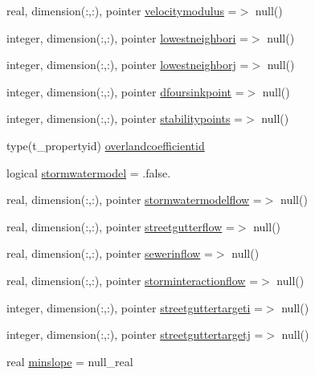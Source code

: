 \begin{DoxyCompactItemize}
real, dimension(\+:,\+:), pointer \mbox{\hyperlink{structmodulerunoff_1_1t__runoff_a9a3dbef4833492c548078e7cbb47c4f1}{velocitymodulus}} =$>$ null()
\item 
integer, dimension(\+:,\+:), pointer \mbox{\hyperlink{structmodulerunoff_1_1t__runoff_a44d937c36d4dad96ed42aedc2c59bede}{lowestneighbori}} =$>$ null()
\item 
integer, dimension(\+:,\+:), pointer \mbox{\hyperlink{structmodulerunoff_1_1t__runoff_a59594f2828bc262de856dcd69a63edfd}{lowestneighborj}} =$>$ null()
\item 
integer, dimension(\+:,\+:), pointer \mbox{\hyperlink{structmodulerunoff_1_1t__runoff_ac04892a641f2c68f5e8bc23e9abe6f97}{dfoursinkpoint}} =$>$ null()
\item 
integer, dimension(\+:,\+:), pointer \mbox{\hyperlink{structmodulerunoff_1_1t__runoff_a25712629e5db7e466e16cd92e6131c33}{stabilitypoints}} =$>$ null()
\item 
type(t\+\_\+propertyid) \mbox{\hyperlink{structmodulerunoff_1_1t__runoff_a8247870adea77731f864f2204914e7e6}{overlandcoefficientid}}
\item 
logical \mbox{\hyperlink{structmodulerunoff_1_1t__runoff_a59e031c1571339f6e29026644c41f3fa}{stormwatermodel}} = .false.
\item 
real, dimension(\+:,\+:), pointer \mbox{\hyperlink{structmodulerunoff_1_1t__runoff_a7677329d48ff38541302369aa3d03e41}{stormwatermodelflow}} =$>$ null()
\item 
real, dimension(\+:,\+:), pointer \mbox{\hyperlink{structmodulerunoff_1_1t__runoff_a9b1fb77f23d1725e0b87a60cb0cb8d17}{streetgutterflow}} =$>$ null()
\item 
real, dimension(\+:,\+:), pointer \mbox{\hyperlink{structmodulerunoff_1_1t__runoff_ae4358af27ddba5bf616856ce227e8eaa}{sewerinflow}} =$>$ null()
\item 
real, dimension(\+:,\+:), pointer \mbox{\hyperlink{structmodulerunoff_1_1t__runoff_aba5edcda294a5b8fb64d55890b7aba47}{storminteractionflow}} =$>$ null()
\item 
integer, dimension(\+:,\+:), pointer \mbox{\hyperlink{structmodulerunoff_1_1t__runoff_adb873b70afa3605bd1af16a60f29c994}{streetguttertargeti}} =$>$ null()
\item 
integer, dimension(\+:,\+:), pointer \mbox{\hyperlink{structmodulerunoff_1_1t__runoff_ae09252af96bec7019defd1386e9ad78a}{streetguttertargetj}} =$>$ null()
\item 
real \mbox{\hyperlink{structmodulerunoff_1_1t__runoff_abc91c3e930d2c3524789d1958f50db05}{minslope}} = null\+\_\+real

\end{DoxyCompactItemize}
